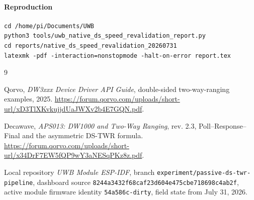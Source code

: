 \documentclass[11pt,a4paper]{article}
\begin{document}
\paragraph{Reproduction}
\begin{verbatim}
cd /home/pi/Documents/UWB
python3 tools/uwb_native_ds_speed_revalidation_report.py
cd reports/native_ds_speed_revalidation_20260731
latexmk -pdf -interaction=nonstopmode -halt-on-error report.tex
\end{verbatim}

\begin{thebibliography}{9}

Qorvo, \emph{DW3xxx Device Driver API Guide}, double-sided two-way-ranging
examples, 2025.
\url{https://forum.qorvo.com/uploads/short-url/xD3TlXKvkujjdUaJWXv2b4E7GQN.pdf}.

Decawave, \emph{APS013: DW1000 and Two-Way Ranging}, rev. 2.3,
Poll--Response--Final and the asymmetric DS-TWR formula.
\url{https://forum.qorvo.com/uploads/short-url/x34DrF7EW5fQP9wY3aNESqPKz8z.pdf}.

Local repository \emph{UWB Module ESP-IDF}, branch
\texttt{experiment/passive-ds-twr-pipeline}, dashboard source
\texttt{8244a3432f68caf23d604e475cbe718698c4ab2f}, active module firmware
identity \texttt{54a586c-dirty}, field state from July 31, 2026.

\end{thebibliography}
\end{document}
